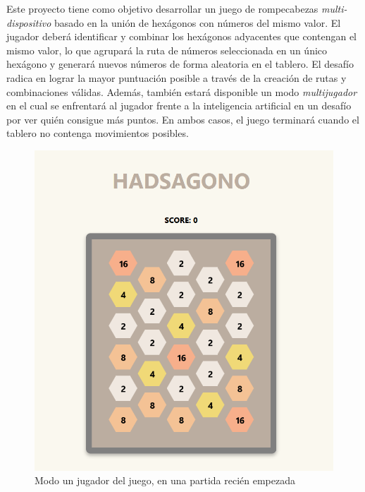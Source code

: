 \documentclass[12pt,epsf,titlepage,a4paper]{article}
\begin{document}
Este proyecto tiene como objetivo desarrollar un juego de rompecabezas \emph{multi-dispositivo} basado en la unión de hexágonos con números del mismo valor. El jugador deberá identificar y combinar los hexágonos adyacentes que contengan el mismo valor, lo que agrupará la ruta de números seleccionada en un único hexágono y generará nuevos números de forma aleatoria en el tablero. El desafío radica en lograr la mayor puntuación posible a través de la creación de rutas y combinaciones válidas. Además, también estará disponible un modo \emph{multijugador} en el cual se enfrentará al jugador frente a la inteligencia artificial en un desafío por ver quién consigue más puntos. En ambos casos, el juego terminará cuando el tablero no contenga movimientos posibles.


\begin{figure}[h]
  \centering
  \includegraphics[scale=0.30]{img/single.png}
  \caption{Modo un jugador del juego, en una partida recién empezada}
  \label{fig:capturaaplicacion}
\end{figure}
\end{document}
